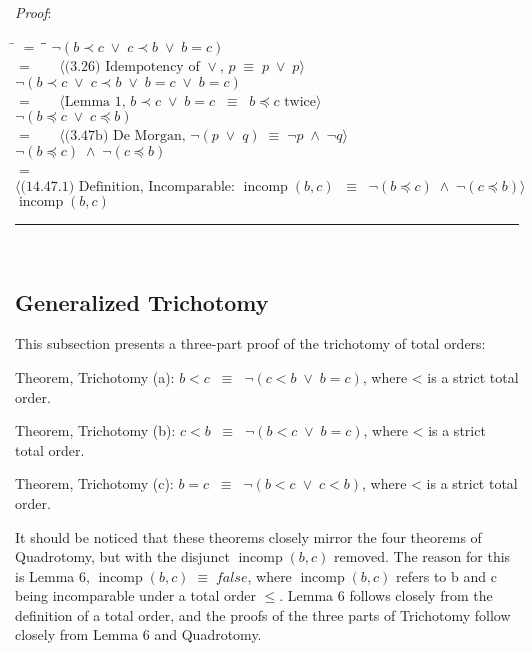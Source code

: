 \documentclass[12pt, fleqn, leqno]{article}
\newcommand{\lgap}{2pt}                             %
\newcommand{\mymathindent}{24pt}                    %
\newcommand{\equivs}{\ensuremath{\;\equiv\;}}       %
\newcommand{\equivss}{\ensuremath{\;\;\equiv\;\;}}  %
\newcommand{\lors}{\ensuremath{\;\lor\;}}           %
\newcommand{\lands}{\ensuremath{\;\land\;}}         %
\newcommand{\myqed}{\rule[-.23ex]{1.2ex}{2.0ex}}
\newcommand{\myqedtab}{\hspace{384pt}}              %
\newcommand{\Gll} {\langle}                         %
\newcommand{\Ggg} {\rangle}                         %
\newcommand{\Hint}[1]     {\ \ \ $\Gll              \mbox{#1} \Ggg$ }   %
\DeclareMathOperator{\incomp}{incomp}
\begin{document}
\textit{Proof}:
\begin{tabbing}
\hspace{\mymathindent} \= $= \;$ \= \myqedtab \= \kill
	\> \>  $\lnot(b \prec c \lors c \prec b \lors b = c)$\\
	\> $=$  \>  \Hint{(3.26) Idempotency of $\lor$, $p \equivs p \lors p$}\\[\lgap]
	\> \>   $\lnot(b \prec c \lors c \prec b \lors b = c \lors b = c)$\\
	\> $=$  \>  \Hint{Lemma 1, $b \prec c \lors b = c \equivss b \preceq c$ twice}\\[\lgap]
	\> \>   $\lnot (b \preceq c \lors c \preceq b)$\\
	\> $=$  \>  \Hint{(3.47b) De Morgan, $\lnot (p \lors q) \equivs \lnot p \lands \lnot q$}\\[\lgap]
	\> \>   $\lnot (b \preceq c) \lands \lnot (c \preceq b)$\\
	\> $=$  \>  \Hint{(14.47.1) Definition, Incomparable: $\incomp(b, c) \equivss \lnot(b \preceq c) \lands \lnot(c \preceq b)$}\\[\lgap]
	\> \>   $\incomp(b, c)$ \quad \myqed\\
\end{tabbing}

\subsection{Generalized Trichotomy} \label{Trichotomy}

This subsection presents a three-part proof of the trichotomy of total orders:

Theorem, Trichotomy (a): $b < c \equivss \lnot(c < b \lors b = c)$, where < is a strict total order.

Theorem, Trichotomy (b): $c < b \equivss \lnot(b < c \lors b = c)$, where < is a strict total order.

Theorem, Trichotomy (c): $b = c \equivss \lnot(b < c \lors c < b)$, where < is a strict total order.

It should be noticed that these theorems closely mirror the four theorems of Quadrotomy, but with the disjunct $\incomp(b,c)$ removed.
The reason for this is Lemma 6, $\incomp(b,c) \equivs false$, where $\incomp(b,c)$ refers to b and c being incomparable under a total order $\le$.
Lemma 6 follows closely from the definition of a total order, and the proofs of the three parts of Trichotomy follow closely from Lemma 6 and Quadrotomy.\\
\end{document}
